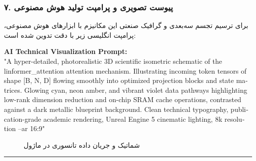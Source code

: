 \subsubsection*{۷. پیوست تصویری و پرامپت تولید هوش مصنوعی}
برای ترسیم تجسم سه‌بعدی و گرافیک صنعتی این مکانیزم با ابزارهای هوش مصنوعی، پرامپت انگلیسی زیر با دقت تدوین شده است:

\vspace{0.2cm}
\begin{latin}
\footnotesize
\textbf{AI Technical Visualization Prompt:}\\
"A hyper-detailed, photorealistic 3D scientific isometric schematic of the linformer\_attention attention mechanism. Illustrating incoming token tensors of shape [B, N, D] flowing smoothly into optimized projection blocks and state matrices. Glowing cyan, neon amber, and vibrant violet data pathways highlighting low-rank dimension reduction and on-chip SRAM cache operations, contrasted against a dark metallic blueprint background. Clean technical typography, publication-grade academic rendering, Unreal Engine 5 cinematic lighting, 8k resolution --ar 16:9"
\end{latin}

\begin{figure}[H]
    \centering
    \caption{شماتیک و جریان داده تانسوری در ماژول }
    \label{fig:linformer_attention}
\end{figure}

\vspace{0.5cm}
\hrule
\vspace{0.5cm}
